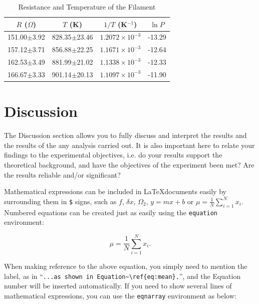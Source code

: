 \documentclass[11pt, a4paper]{article}
\begin{document}
\begin{table}[htbp]
\caption{Resistance and Temperature of the Filament}
\label{tab:data}
\begin{center}
\begin{tabular}{|c||c|c|c|}
\hline
$R$ ($\Omega$) & $T$ (K) & $1/T$ (K$^{-1}$) & $\ln P$ \\
\hline\hline
151.00$\pm$3.92 & 828.35$\pm$23.46& $1.2072\times10^{-3}$& -13.29 \\ \hline
157.12$\pm$3.71 & 856.88$\pm$22.25& $1.1671\times10^{-3}$& -12.64 \\ \hline
162.53$\pm$3.49 & 881.99$\pm$21.02& $1.1338\times10^{-3}$& -12.33 \\ \hline
166.67$\pm$3.33 & 901.14$\pm$20.13& $1.1097\times10^{-3}$& -11.90 \\ \hline
\hline
\end{tabular}
\end{center}
\end{table}

\section{Discussion}

The Discussion section allows you to fully discuss and interpret the results and the results of the any analysis carried out. It is also important here to relate your findings to the experimental objectives, i.e. do your results support the theoretical background, and have the objectives of the experiment been met? Are the results reliable and/or significant?

Mathematical expressions can be included in \LaTeX documents easily by surrounding them in \verb|$| signs, such as $f$, $\delta x$, $\Omega_2$, $y=mx+b$ or $\mu = \frac{1}{N}\sum_{i=1}^N x_i$. Numbered equations can be created just as easily using the \verb|equation| environment:

\begin{equation}
\mu = \frac{1}{N}\sum_{i=1}^N x_i.
\label{eq:mean}
\end{equation}

When making reference to the above equation, you simply need to mention the label, as in ``\verb|...as shown in Equation~\ref{eq:mean}.|'', and the Equation number will be inserted automatically. If you need to show several lines of mathematical expressions, you can use the \verb|eqnarray| environment as below:
\end{document}
